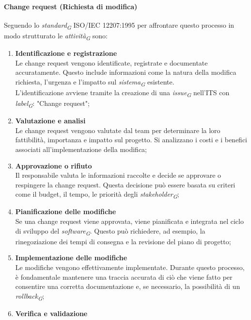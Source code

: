 \paragraph{Change request (Richiesta di modifica)}
Seguendo lo \textit{standard}\textsubscript{\textit{G}} ISO/IEC 12207:1995 per affrontare questo processo in modo strutturato le \textit{attività}\textsubscript{\textit{G}} sono:
\begin{enumerate}
    \item \textbf{Identificazione e registrazione} \\
    Le change request vengono identificate, registrate e documentate accuratamente. Questo include informazioni come la natura della modifica richiesta, l'urgenza e l'impatto sul \textit{sistema}\textsubscript{\textit{G}} esistente. \\
    L'identificazione avviene tramite la creazione di una \textit{issue}\textsubscript{\textit{G}} nell'ITS con \textit{label}\textsubscript{\textit{G}}: "Change request";
    \item \textbf{Valutazione e analisi} \\
    Le change request vengono valutate dal team per determinare la loro fattibilità, importanza e impatto sul progetto. Si analizzano i costi e i benefici associati all'implementazione della modifica;
    \item \textbf{Approvazione o rifiuto} \\
    Il responsabile valuta le informazioni raccolte e decide se approvare o respingere la change request. Questa decisione può essere basata su criteri come il budget, il tempo, le priorità degli \textit{stakeholder}\textsubscript{\textit{G}};
    \item \textbf{Pianificazione delle modifiche} \\
    Se una change request viene approvata, viene pianificata e integrata nel ciclo di sviluppo del \textit{software}\textsubscript{\textit{G}}. Questo può richiedere, ad esempio, la rinegoziazione dei tempi di consegna e la revisione del piano di progetto;
    \item \textbf{Implementazione delle modifiche} \\
    Le modifiche vengono effettivamente implementate. Durante questo processo, è fondamentale mantenere una traccia accurata di ciò che viene fatto per consentire una corretta documentazione e, se necessario, la possibilità di un \textit{rollback}\textsubscript{\textit{G}};
    \item \textbf{Verifica e validazione} \\

\end{enumerate}
